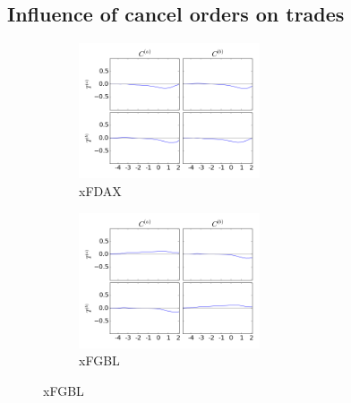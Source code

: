 \documentclass[a4paper,11pt]{article}
\begin{document}
\subsection{Influence of cancel orders on trades}
\label{CT}
\begin{figure}[H]
        \begin{subfigure}[b]{0.45\textwidth}
                \includegraphics[width=\textwidth,height=40mm]{xFDAXPA_PB_TA_TB_LA_LB_CA_CB__CACB-_TATBcausality.png}
                \caption{xFDAX}
        \end{subfigure}
        \begin{subfigure}[b]{0.45\textwidth}
                \includegraphics[width=\textwidth,height=40mm]{xFGBLPA_PB_TA_TB_LA_LB_CA_CB__CACB-_TATBcausality.png}
                \caption{xFGBL}
        \end{subfigure}
\end{figure}
\end{document}
